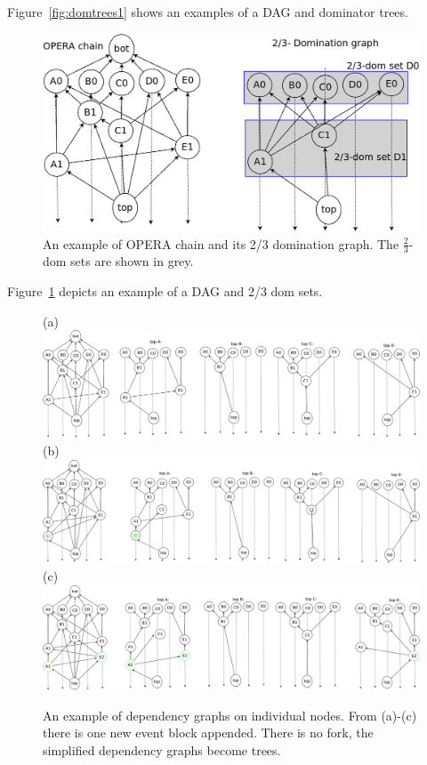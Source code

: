 \documentclass{article}
\begin{document}
Figure~\ref{fig:domtrees1} shows an examples of a DAG and dominator trees. 

\begin{figure}[h]
	\centering
	\includegraphics[width=0.5\linewidth]{domset}
	\caption{An example of OPERA chain and its 2/3 domination graph. The $\frac{2}{3}$-dom sets are shown in grey.}
	\label{fig:domset1}
\end{figure}

Figure~\ref{fig:domset1} depicts an example of a DAG and 2/3 dom sets.
\newpage

\begin{figure}[h]
	\centering
	(a) \includegraphics[width=0.9\linewidth]{deptrees}  \\
	(b) \includegraphics[width=0.9\linewidth]{deptrees_mod_add1event} \\
	(c) \includegraphics[width=0.9\linewidth]{deptrees_mod_add2event}
	\caption{An example of dependency graphs on individual nodes. From (a)-(c) there is one new event block appended. There is no fork, the simplified dependency graphs become trees.}
	\label{fig:deptreesmod1}
\end{figure}
\end{document}
